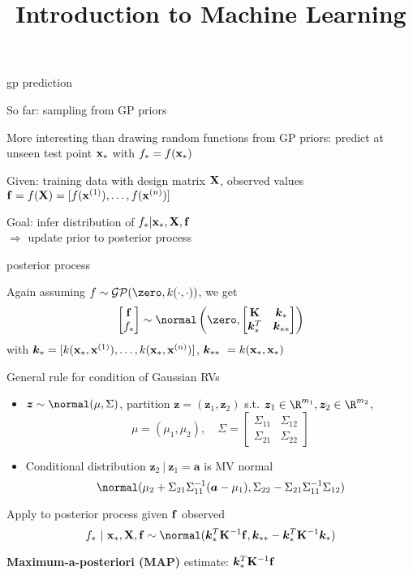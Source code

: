 \documentclass[11pt,compress,t,notes=noshow, xcolor=table]{beamer}
\title{Introduction to Machine Learning}
\begin{document}

\begin{framei}[sep=L]{gp prediction}
\item So far: sampling from GP priors
\item More interesting than drawing random functions from GP priors: predict at unseen test point $\xv_\ast$ with $f_\ast = f(\xv_\ast)$
\item Given: training data with design matrix $\Xmat$, observed values $\fv = f(\Xmat) = \fvec$
\item Goal: infer distribution of $f_\ast | \xv_\ast, \Xmat, \fv$ \\$\Rightarrow$ update prior to posterior process
\end{framei}

\begin{framei}[sep=M]{posterior process}
\item Again assuming $f \sim \mathcal{GP}(\zero, k(\cdot, \cdot))$, we get
$$\begin{bmatrix}
\fv \\ f_\ast
\end{bmatrix} \sim  
\normal \left(\zero, \begin{bmatrix} \Kmat & \bm{k}_* \\ \bm{k}_*^T & \bm{k}_{**}\end{bmatrix}\right)$$
with $\bm{k}_* = [k(\xv_*, \xi[1]), \dots, k(\xv_*, \xi[n])]$,  $ \bm{k}_{**}\ = k(\xv_*, \xv_*)$
\item General rule for condition of Gaussian RVs
\begin{itemize}
\item $\bm{z} \sim \normal(\mu, \Sigma)$, partition $\bm{z} = (\bm{z}_1, \bm{z}_2)$ s.t. $\bm{z}_1 \in \R^{m_1}, \bm{z}_2 \in \R^{m_2}$, $$\mu = (\mu_1, \mu_2), \quad \Sigma = \begin{bmatrix} \Sigma_{11} & \Sigma_{12} \\ \Sigma_{21} & \Sigma_{22} \end{bmatrix} $$
\item Conditional distribution $\bm{z}_2 ~|~ \bm{z}_1 = \bm{a}$ is MV normal 
$$\normal(\mu_2 + \Sigma_{21} \Sigma_{11}^{-1} (\bm{a} - \mu_1), \Sigma_{22} - \Sigma_{21}\Sigma_{11}^{-1} \Sigma_{12})$$
\end{itemize}
\item Apply to posterior process given $\fv$ observed $$f_* ~|~ \xv_*, \Xmat, \fv \sim \normal(\bm{k}_{*}^{T}\Kmat^{-1}\fv, \bm{k}_{**} - \bm{k}_*^T \Kmat ^{-1}\bm{k}_*)$$
\item \textbf{Maximum-a-posteriori (MAP)} estimate: $\bm{k}_{*}^{T}\Kmat^{-1}\fv$
\end{framei}
\end{document}
